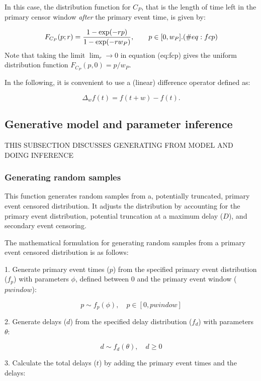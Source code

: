 \documentclass[10pt,letterpaper]{article}
\begin{document}
In this case, the distribution function for $C_P$, that is the length of time left in the primary censor window \textit{after} the primary event time, is given by:

\begin{equation}
F_{C_P}(p; r) = {  1 - \exp(-r p) \over 1 - \exp(-r w_P)}, \qquad p \in [0, w_P]. (\#eq:fcp)
\end{equation}
Note that taking the limit $\lim_r \rightarrow 0$ in equation \@ref(eq:fcp) gives the uniform distribution function $F_{C_P}(p, 0) = p / w_P$.

In the following, it is convenient to use a (linear) difference operator defined as:

\begin{equation}
\Delta_{w}f(t) = f(t + w) - f(t).
\end{equation}

\subsection{Generative model and parameter inference}
THIS SUBSECTION DISCUSSES GENERATING FROM MODEL AND DOING INFERENCE 
\subsubsection{Generating random samples}
This function generates random samples from a, potentially truncated, primary event censored distribution. It adjusts the distribution by accounting for the primary event distribution, potential truncation at a maximum delay ($D$), and secondary event censoring.

The mathematical formulation for generating random samples from a primary event censored distribution is as follows:

1. Generate primary event times ($p$) from the specified primary event distribution ($f_p$) with parameters $\phi$, defined between 0 and the primary event window ($pwindow$):

\begin{equation}p \sim f_p(\phi), \quad p \in [0, pwindow]\end{equation}

2. Generate delays ($d$) from the specified delay distribution ($f_d$) with parameters $\theta$:

\begin{equation}d \sim f_d(\theta), \quad d \geq 0\end{equation}

3. Calculate the total delays ($t$) by adding the primary event times and the delays:
\end{document}
